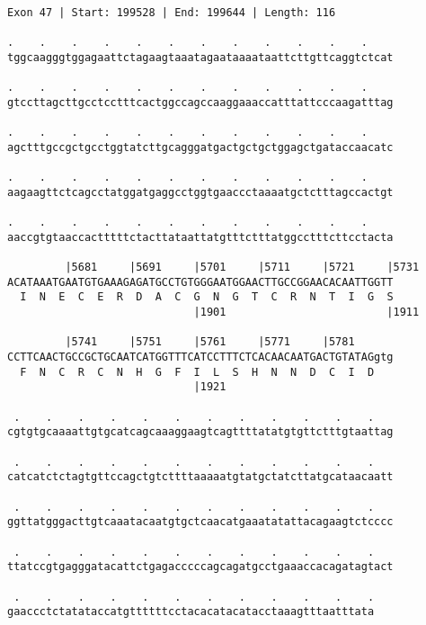 \documentclass{article}
\begin{document}
\begin{Verbatim}
Exon 47 | Start: 199528 | End: 199644 | Length: 116
 
.    .    .    .    .    .    .    .    .    .    .    .    
tggcaagggtggagaattctagaagtaaatagaataaaataattcttgttcaggtctcat
  
.    .    .    .    .    .    .    .    .    .    .    .    
gtccttagcttgcctcctttcactggccagccaaggaaaccatttattcccaagatttag
  
.    .    .    .    .    .    .    .    .    .    .    .    
agctttgccgctgcctggtatcttgcagggatgactgctgctggagctgataccaacatc
  
.    .    .    .    .    .    .    .    .    .    .    .    
aagaagttctcagcctatggatgaggcctggtgaaccctaaaatgctctttagccactgt
  
.    .    .    .    .    .    .    .    .    .    .    .    
aaccgtgtaaccactttttctacttataattatgtttctttatggcctttcttcctacta
  
         |5681     |5691     |5701     |5711     |5721     |5731
ACATAAATGAATGTGAAAGAGATGCCTGTGGGAATGGAACTTGCCGGAACACAATTGGTT
  I  N  E  C  E  R  D  A  C  G  N  G  T  C  R  N  T  I  G  S
                             |1901                         |1911
  
         |5741     |5751     |5761     |5771     |5781      
CCTTCAACTGCCGCTGCAATCATGGTTTCATCCTTTCTCACAACAATGACTGTATAGgtg
  F  N  C  R  C  N  H  G  F  I  L  S  H  N  N  D  C  I  D   
                             |1921                          
  
 .    .    .    .    .    .    .    .    .    .    .    .   
cgtgtgcaaaattgtgcatcagcaaaggaagtcagttttatatgtgttctttgtaattag
  
 .    .    .    .    .    .    .    .    .    .    .    .   
catcatctctagtgttccagctgtcttttaaaaatgtatgctatcttatgcataacaatt
  
 .    .    .    .    .    .    .    .    .    .    .    .   
ggttatgggacttgtcaaatacaatgtgctcaacatgaaatatattacagaagtctcccc
  
 .    .    .    .    .    .    .    .    .    .    .    .   
ttatccgtgagggatacattctgagacccccagcagatgcctgaaaccacagatagtact
  
 .    .    .    .    .    .    .    .    .    .    .    .
gaaccctctatataccatgttttttcctacacatacatacctaaagtttaatttata
\end{Verbatim}
\newpage
\end{document}
